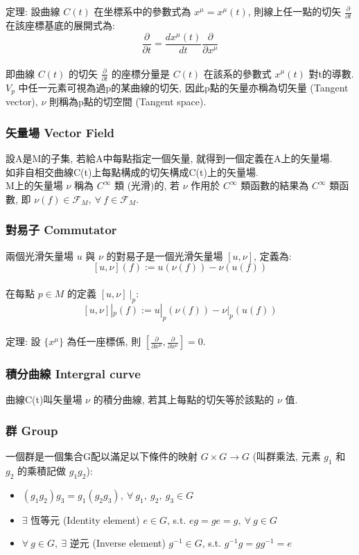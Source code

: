 \documentclass{article}
\begin{document}
\begin{CJK}{UTF8}{bsmi}
定理: 設曲線 $C(t)$ 在坐標系中的參數式為 $x^\mu=x^\mu(t)$, 則線上任一點的切矢 $\frac{\partial}{\partial t}$ 在該座標基底的展開式為: 
$$\frac{\partial}{\partial t}=\frac{dx^\mu(t)}{dt} \frac{\partial}{\partial x^\mu} $$
\\ 即曲線 $C(t)$ 的切矢 $\frac{\partial}{\partial t}$ 的座標分量是 $C(t)$ 在該系的參數式 $x^\mu(t)$ 對t的導數.
\\ $V_p$ 中任一元素可視為過p的某曲線的切矢, 因此p點的矢量亦稱為切矢量 (Tangent vector), $\nu$ 則稱為p點的切空間 (Tangent space).
\subsubsection{矢量場 Vector Field}
設A是M的子集, 若給A中每點指定一個矢量, 就得到一個定義在A上的矢量場.
\\ 如非自相交曲線C(t)上每點構成的切矢構成C(t)上的矢量場.
\\ M上的矢量場 $\nu$ 稱為 $C^\infty$ 類 (光滑)的, 若 $\nu$ 作用於 $C^\infty$ 類函數的結果為 $C^\infty$ 類函數, 即 $\nu(f)\in \mathscr{F}_M,\ \forall\ f\in\mathscr{F}_M$.
\subsubsection{對易子 Commutator}
兩個光滑矢量場 $u$ 與 $\nu$ 的對易子是一個光滑矢量場 $[u,\nu]$, 定義為: $$ [u,\nu](f):=u(\nu(f))-\nu(u(f))$$
\\ 在每點 $p\in M$ 的定義 $[u,\nu]\ |_p $: 
 $$[u,\nu]|_p(f):=u|_p(\nu(f))-\nu|_p(u(f)) $$
\\

定理: 設 $\{ x^\mu\}$ 為任一座標係, 則 $[\frac{\partial}{\partial x^\mu},\frac{\partial}{\partial x^\nu}]=0$.
\subsubsection{積分曲線 Intergral curve}
曲線C(t)叫矢量場 $\nu$ 的積分曲線, 若其上每點的切矢等於該點的 $\nu$ 值.
\subsubsection{群 Group}
一個群是一個集合G配以滿足以下條件的映射 $G\times G \rightarrow G$ (叫群乘法, 元素 $g_1$ 和 $g_2$ 的乘積記做 $g_1 g_2$):
\begin{itemize}
  \item $(g_1 g_2)g_3=g_1(g_2g_3),\ \forall\ g_1,\ g_2,\ g_3 \in G$
  \item $\exists$ 恆等元 (Identity element) $e\in G$, s.t. $eg=ge=g,\ \forall\ g\in G$
  \item $\forall\ g\in G,\ \exists$ 逆元 (Inverse element) $g^{-1}\in G$, s.t. $g^{-1}g=gg^{-1}=e$
\end{itemize}

\end{CJK}
\end{document}
